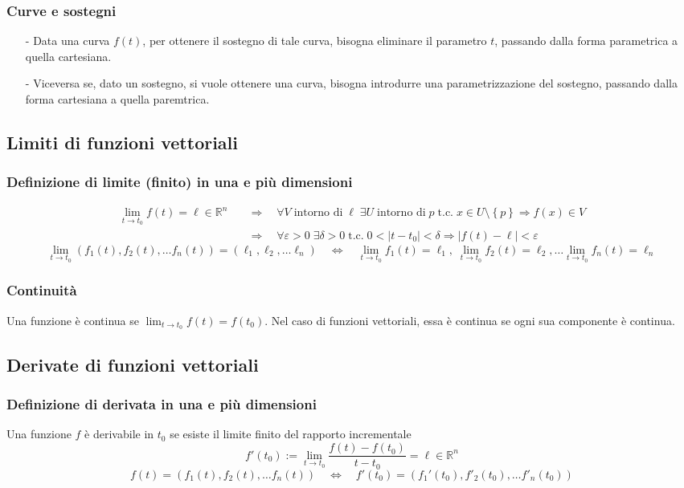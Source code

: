 \documentclass[a4paper]{article}
\newcommand\Rn{\mathbb{R}^n}  %
\newcommand\tc{\text{t.c.}}   %
\begin{document}
\subsubsection*{Curve e sostegni}
\begin{itemize}[topsep=3pt, itemsep=0pt]
	\item[-] Data una curva \(f(t)\), per ottenere il sostegno di tale curva, bisogna eliminare il parametro \(t\), passando dalla
	forma parametrica a quella cartesiana.
	\item[-] Viceversa se, dato un sostegno, si vuole ottenere una curva, bisogna introdurre una parametrizzazione del sostegno,
	passando dalla forma cartesiana a quella paremtrica.
\end{itemize}

\subsection{Limiti di funzioni vettoriali}
\subsubsection*{Definizione di limite (finito) in una e più dimensioni}
\begin{align*}
	\lim_{t \to t_0} f(t) = \ell \in \Rn \quad &\Rightarrow \quad \forall V \; \text{intorno di} \; \ell \; \exists U \; \text{intorno di} \; p \; \tc \; x \in U \setminus \left\{p\right\} \Rightarrow f(x) \in V \\
	&\Rightarrow \quad \forall \varepsilon > 0 \; \exists \delta > 0 \; \tc \; 0 < \left|t-t_0\right| < \delta \Rightarrow \left|f(t) - \ell\right| < \varepsilon
\end{align*}
\[\lim_{t \to t_0} (f_1(t), f_2(t), \dots f_n(t)) = (\ell_1, \ell_2, \dots \ell_n) \quad \Leftrightarrow \quad \lim_{t \to t_0} f_1(t) = \ell_1, \; \lim_{t \to t_0} f_2(t) = \ell_2, \dots \lim_{t \to t_0} f_n(t) = \ell_n\]

\subsubsection*{Continuità}
Una funzione è continua se \(\lim_{t \to t_0} f(t) = f(t_0)\). Nel caso di funzioni vettoriali, essa è continua se ogni sua componente
è continua.

\subsection{Derivate di funzioni vettoriali}
\subsubsection*{Definizione di derivata in una e più dimensioni}
Una funzione \(f\) è derivabile in \(t_0\) se esiste il limite finito del rapporto incrementale 
\[f'(t_0) := \lim_{t \to t_0} \frac{f(t)-f(t_0)}{t-t_0} = \ell \in \Rn\]
\[f(t) = \left(f_1(t), f_2(t), \dots f_n(t) \right) \quad \Leftrightarrow \quad f'(t_0) = \left( f_1'(t_0), f'_2(t_0), \dots f'_n(t_0)\right)\]
\end{document}
